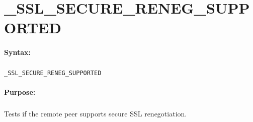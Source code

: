
\newpage
\section{\_SSL\_SECURE\_RENEG\_SUPPORTED}
\label{cmd:_SSL_SECURE_RENEG_SUPPORTED}

\paragraph{Syntax:}
\subparagraph{}
\texttt{\_SSL\_SECURE\_RENEG\_SUPPORTED}

\paragraph{Purpose:}
\subparagraph{}
Tests if the remote peer supports secure SSL renegotiation.


